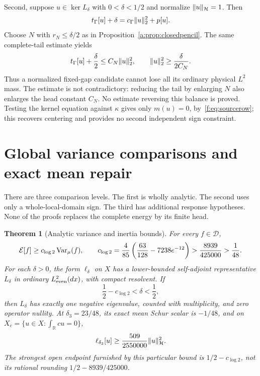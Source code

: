 \documentclass[11pt,a4paper]{article}
\numberwithin{equation}{section}
\newtheorem{theorem}{Theorem}[section]
\theoremstyle{definition}\newtheorem{definition}[theorem]{Definition}
\theoremstyle{remark}\newtheorem{remark}[theorem]{Remark}
\newcommand{\R}{\mathbb R}\newcommand{\C}{\mathbb C}\newcommand{\N}{\mathbb N}
\newcommand{\E}{\mathcal E}\newcommand{\D}{\mathcal D}
\newcommand{\Hh}{\mathcal H}\newcommand{\Hw}{\mathcal H}
\newcommand{\tg}{t_\Gamma}\newcommand{\cg}{c_\Gamma}
\begin{document}
Second, suppose $u\in\ker L_\delta$ with $0<\delta<1/2$ and normalize $\norm{u}_{\Hh}=1$. Then
\begin{equation}\label{f:eq:stateidentity}
 \tg[u]+\delta=\cg\norm{u}_2^2+p[u].
\end{equation}
Choose $N$ with $r_N\le\delta/2$ as in Proposition~\ref{a:prop:closedpencil}. The same complete-tail estimate yields
\begin{equation}\label{f:eq:statebound}
 \tg[u]+\frac\delta2\le C_N\norm{u}_2^2,
 \qquad \norm{u}_2^2\ge\frac{\delta}{2C_N}.
\end{equation}
Thus a normalized fixed-gap candidate cannot lose all its ordinary physical $L^2$ mass. The estimate is not contradictory: reducing the tail by enlarging $N$ also enlarges the head constant $C_N$. No estimate reversing this balance is proved. Testing the kernel equation against $\kappa$ gives only $m(u)=0$, by~\eqref{f:eq:sourcerow}; this recovers centering and provides no second independent sign constraint.


\section{Global variance comparisons and exact mean repair}\label{sec:bounds}
There are three comparison levels. The first is wholly analytic. The second uses only a whole-local-domain sign. The third has additional response hypotheses. None of the proofs replaces the complete energy by its finite head.


\begin{theorem}[Analytic variance and inertia bounds]\label{a:thm:mainseed}
For every $f\in\D$,
\begin{equation}\label{a:eq:mainseed}
 \E[f]\ge c_{\log 2}\Var_\mu(f),\qquad
 c_{\log 2}=\frac4{85}\left(\frac{63}{128}-7238e^{-12}\right)
 >\frac{8939}{425000}>\frac1{48}.
\end{equation}
For each $\delta>0$, the form $\ell_\delta$ on $X$ has a lower-bounded self-adjoint representative $L_\delta$ in ordinary $L^2_{\mathrm{even}}(dx)$, with compact resolvent. If
\[
 \frac12-c_{\log 2}<\delta<\frac12,
\]
then $L_\delta$ has exactly one negative eigenvalue, counted with multiplicity, and zero operator nullity. At $\delta_3=23/48$, its exact mean Schur scalar is $-1/48$, and on $X_c=\{u\in X:\int_\R cu=0\}$,
\begin{equation}\label{a:eq:mainmargin}
 \ell_{\delta_3}[u]\ge\frac{509}{2550000}\norm{u}_{\Hh}^2.
\end{equation}
The strongest open endpoint furnished by this particular bound is $1/2-c_{\log 2}$, not its rational rounding $1/2-8939/425000$.
\end{theorem}
\end{document}
